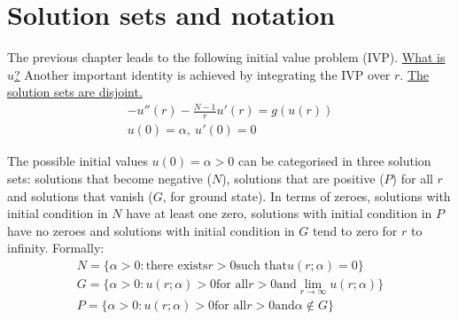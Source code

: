 \section{Solution sets and notation}\label{not}
The previous chapter leads to the following initial value problem (IVP). \underline{What is $u$?} Another important identity is achieved by integrating the IVP over $r$. \underline{The solution sets are disjoint.}
\begin{gather*}-u''(r)-\frac{N-1}{r}u'(r)=g(u(r))\tag{IVP}\label{ivp}\\ u(0)=\alpha,~u'(0)=0\end{gather*}
\begin{equation}\label{ivpint}
\end{equation}

The possible initial values $u(0)=\alpha>0$ can be categorised in three solution sets: solutions that become negative ($N$), solutions that are positive ($P$) for all $r$ and solutions that vanish ($G$, for ground state). In terms of zeroes, solutions with initial condition in $N$ have at least one zero, solutions with initial condition in $P$ have no zeroes and solutions with initial condition in $G$ tend to zero for $r$ to infinity. Formally:
\begin{align}
  N = \{\alpha>0:\text{there exists}r>0\text{such that}u(r;\alpha)=0\} \\
  G = \{\alpha>0:u(r;\alpha)>0\text{for all}r>0\text{and}\underset{r\to\infty}{\lim}u(r;\alpha)\}\\
  P = \{\alpha>0:u(r;\alpha)>0\text{for all}r>0\text{and}\alpha\notin G\}
\end{align}
